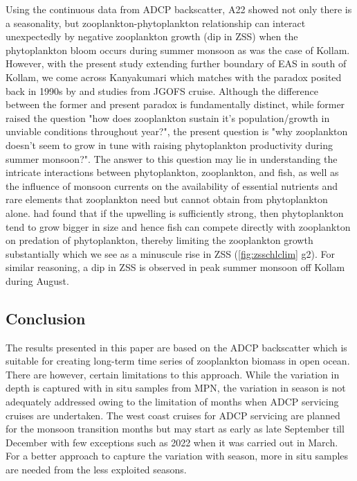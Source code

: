 \documentclass{article}
\begin{document}
	Using the continuous data from ADCP backscatter, A22 showed not only there is a seasonality, but zooplankton-phytoplankton relationship can interact unexpectedly by negative zooplankton growth (dip in ZSS) when the phytoplankton bloom occurs during summer monsoon as was the case of Kollam. However, with the present study extending further boundary of EAS in south of Kollam, we come across Kanyakumari which matches with the paradox posited back in 1990s by \citet{madhupratap1992zooplankton, madhupratap1996lack, smith2005mesozooplankton} and studies from JGOFS cruise. Although the difference between the former and present paradox is fundamentally distinct, while former raised the question "how does zooplankton sustain it's population/growth in unviable conditions throughout year?", the present question is "why zooplankton doesn't seem to grow in tune with raising phytoplankton productivity during summer monsoon?". The answer to this question may lie in understanding the intricate interactions between phytoplankton, zooplankton, and fish, as well as the influence of monsoon currents on the availability of essential nutrients and rare elements that zooplankton need but cannot obtain from phytoplankton alone. \citep{shankar2019role} had found that if the upwelling is sufficiently strong, then phytoplankton tend to grow bigger in size and hence fish can compete directly with zooplankton on predation of phytoplankton, thereby limiting the zooplankton growth substantially which we see as a minuscule rise in ZSS (\cref{fig:zsschlclim} g2). For similar reasoning, a dip in ZSS is observed in peak summer monsoon off Kollam during August.

	\subsection{Conclusion}
	The results presented in this paper are based on the ADCP backscatter which is suitable for creating long-term time series of zooplankton biomass in open ocean. There are however, certain limitations to this approach. While the variation in depth is captured with in situ samples from MPN, the variation in season is not adequately addressed owing to the limitation of months when ADCP servicing cruises are undertaken. The west coast  cruises for ADCP servicing are planned for the monsoon transition months but may start as early as late September till December with few exceptions such as 2022 when it was carried out in March. For a better approach to capture the variation with season, more in situ samples are needed from the less exploited seasons. 
	
\end{document}

